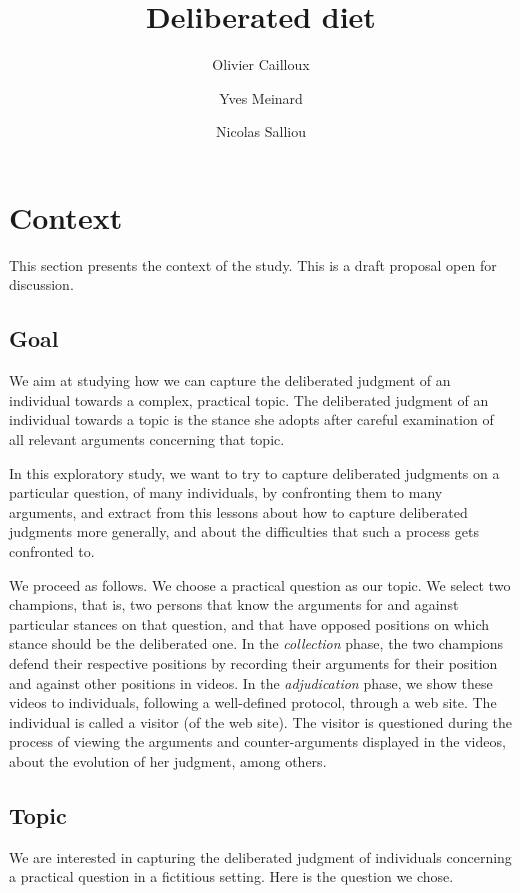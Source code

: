 \documentclass[version=3.21, pagesize, twoside=off, bibliography=totoc, DIV=calc, fontsize=12pt, a4paper]{scrartcl}
\title{Deliberated diet}
\author{Olivier Cailloux}
\author{Yves Meinard}
\affil{Université Paris-Dauphine, PSL Research University, CNRS, LAMSADE, 75016 PARIS, FRANCE}
\author{Nicolas Salliou}
\affil{Affiliation}
\begin{document}
\maketitle

\section{Context}
This section presents the context of the study.
This is a draft proposal open for discussion.
 
\subsection{Goal}
We aim at studying how we can capture the deliberated judgment of an individual towards a complex, practical topic. The deliberated judgment of an individual towards a topic is the stance she adopts after careful examination of all relevant arguments concerning that topic.

In this exploratory study, we want to try to capture deliberated judgments on a particular question, of many individuals, by confronting them to many arguments, and extract from this lessons about how to capture deliberated judgments more generally, and about the difficulties that such a process gets confronted to. 

We proceed as follows. We choose a practical question as our topic. We select two champions, that is, two persons that know the arguments for and against particular stances on that question, and that have opposed positions on which stance should be the deliberated one. In the \emph{collection} phase, the two champions defend their respective positions by recording their arguments for their position and against other positions in videos. In the \emph{adjudication} phase, we show these videos to individuals, following a well-defined protocol, through a web site. The individual is called a visitor (of the web site). The visitor is questioned during the process of viewing the arguments and counter-arguments displayed in the videos, about the evolution of her judgment, among others.

\subsection{Topic}
\label{sec:topic}
We are interested in capturing the deliberated judgment of individuals concerning a practical question in a fictitious setting. Here is the question we chose.
\end{document}
